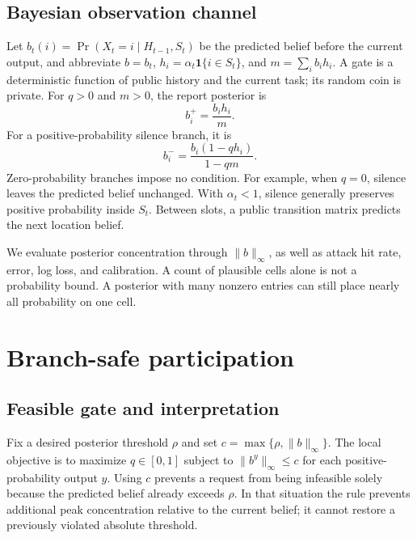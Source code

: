 \documentclass[3p,times]{elsarticle}
\newcommand{\ind}{\mathbf{1}}
\begin{document}
\subsection{Bayesian observation channel}
Let $b_t(i)=\Pr(X_t=i\mid H_{t-1},S_t)$ be the predicted belief before the current output, and abbreviate $b=b_t$, $h_i=\alpha_t\ind\{i\in S_t\}$, and $m=\sum_i b_i h_i$. A gate is a deterministic function of public history and the current task; its random coin is private. For $q>0$ and $m>0$, the report posterior is
\begin{equation}
 b_i^+=\frac{b_i h_i}{m}.
 \label{eq:positive}
\end{equation}
For a positive-probability silence branch, it is
\begin{equation}
 b_i^-=\frac{b_i(1-qh_i)}{1-qm}.
 \label{eq:silence}
\end{equation}
Zero-probability branches impose no condition. For example, when $q=0$, silence leaves the predicted belief unchanged. With $\alpha_t<1$, silence generally preserves positive probability inside $S_t$. Between slots, a public transition matrix predicts the next location belief.

We evaluate posterior concentration through $\|b\|_\infty$, as well as attack hit rate, error, log loss, and calibration. A count of plausible cells alone is not a probability bound. A posterior with many nonzero entries can still place nearly all probability on one cell.

\section{Branch-safe participation}
\label{sec:method}
\subsection{Feasible gate and interpretation}
Fix a desired posterior threshold $\rho$ and set $c=\max\{\rho,\|b\|_\infty\}$. The local objective is to maximize $q\in[0,1]$ subject to $\|b^y\|_\infty\le c$ for each positive-probability output $y$. Using $c$ prevents a request from being infeasible solely because the predicted belief already exceeds $\rho$. In that situation the rule prevents additional peak concentration relative to the current belief; it cannot restore a previously violated absolute threshold.
\end{document}
